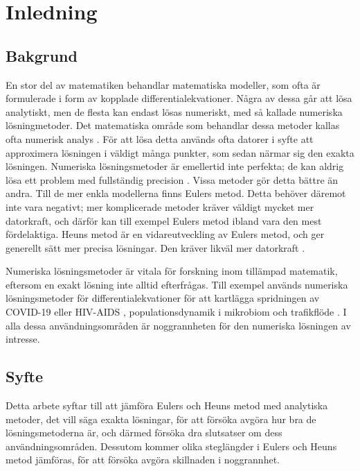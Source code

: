\section{Inledning}
\subsection{Bakgrund}
En stor del av matematiken behandlar matematiska modeller, som ofta är formulerade i form av kopplade differentialekvationer. Några av dessa går att lösa analytiskt, men de flesta kan endast lösas numeriskt, med så kallade numeriska lösningmetoder. Det matematiska område som behandlar dessa metoder kallas ofta numerisk analys \parencite[vii]{suli_introduction_2003}. För att lösa detta används ofta datorer i syfte att approximera lösningen i väldigt många punkter, som sedan närmar sig den exakta lösningen. Numeriska lösningsmetoder är emellertid inte perfekta; de kan aldrig lösa ett problem med fullständig precision \parencite[1]{remani_numerical_2012}. Vissa metoder gör detta bättre än andra. Till de mer enkla modellerna finns Eulers metod. Detta behöver däremot inte vara negativt; mer komplicerade metoder kräver väldigt mycket mer datorkraft, och därför kan till exempel Eulers metod ibland vara den mest fördelaktiga. Heuns metod är en vidareutveckling av Eulers metod, och ger generellt sätt mer precisa lösningar. Den kräver likväl mer datorkraft \parencite[328]{suli_introduction_2003}.

Numeriska lösningsmetoder är vitala för forskning inom tillämpad matematik, eftersom en exakt lösning inte alltid efterfrågas. Till exempel används numeriska lösningsmetoder för differentialekvationer för att kartlägga spridningen av COVID-19 eller HIV-AIDS \parencites{pratiwi_eulers_2021}{simangunsong_fourth_2021}, populationsdynamik i mikrobiom \parencite{remien_structural_2021} och trafikflöde \parencite{nagel_still_2003}. I alla dessa användningsområden är noggrannheten för den numeriska lösningen av intresse.

\subsection{Syfte}
Detta arbete syftar till att jämföra Eulers och Heuns metod med analytiska metoder, det vill säga exakta lösningar, för att försöka avgöra hur bra de lösningsmetoderna är, och därmed försöka dra slutsatser om dess användnings\-områden. Dessutom kommer olika steglängder i Eulers och Heuns metod jämföras, för att försöka avgöra skillnaden i noggrannhet.

